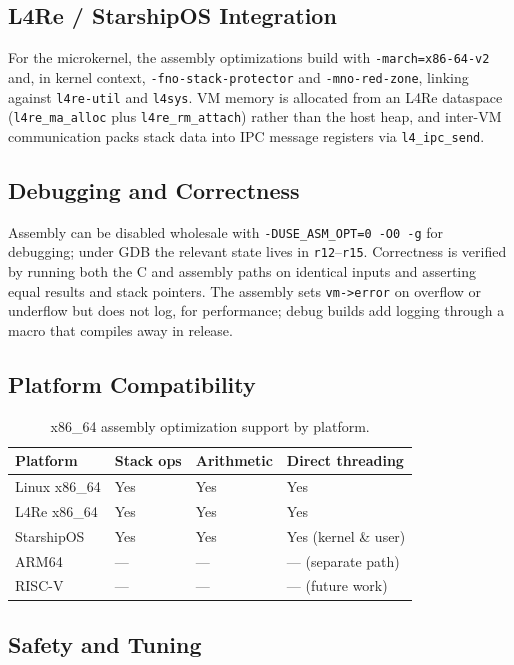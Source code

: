 \subsection{L4Re / StarshipOS Integration}

For the microkernel, the assembly optimizations build with
\texttt{-march=x86-64-v2} and, in kernel context, \texttt{-fno-stack-protector}
and \texttt{-mno-red-zone}, linking against \texttt{l4re-util} and
\texttt{l4sys}. VM memory is allocated from an L4Re dataspace
(\texttt{l4re\_ma\_alloc} plus \texttt{l4re\_rm\_attach}) rather than the host
heap, and inter-VM communication packs stack data into IPC message registers
via \texttt{l4\_ipc\_send}.

\subsection{Debugging and Correctness}

Assembly can be disabled wholesale with \texttt{-DUSE\_ASM\_OPT=0 -O0 -g} for
debugging; under GDB the relevant state lives in \texttt{r12}--\texttt{r15}.
Correctness is verified by running both the C and assembly paths on identical
inputs and asserting equal results and stack pointers. The assembly sets
\texttt{vm->error} on overflow or underflow but does not log, for performance;
debug builds add logging through a macro that compiles away in release.

\subsection{Platform Compatibility}

\begin{table}[h]
\centering
\begin{tabular}{llll}
\toprule
Platform & Stack ops & Arithmetic & Direct threading \\
\midrule
Linux x86\_64 & Yes & Yes & Yes \\
L4Re x86\_64 & Yes & Yes & Yes \\
StarshipOS & Yes & Yes & Yes (kernel \& user) \\
ARM64 & --- & --- & --- (separate path) \\
RISC-V & --- & --- & --- (future work) \\
\bottomrule
\end{tabular}
\caption{x86\_64 assembly optimization support by platform.}
\end{table}

\subsection{Safety and Tuning}

